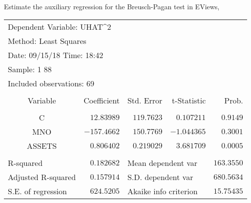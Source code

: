\documentclass[12pt]{report}
\begin{document}
\noindent Estimate the auxiliary regression for the Breusch-Pagan test in EViews,
\begin{figure}[H]
	\centering
\end{figure}
\vspace{-\baselineskip}
\begin{table}[!htbp]
	\centering
	\begin{tabular}{lrrrr}
		\multicolumn{3}{l}{Dependent Variable: UHAT\textasciicircum 2}&\multicolumn{1}{c}{}&\multicolumn{1}{c}{}\\
		\multicolumn{3}{l}{Method: Least Squares}&\multicolumn{1}{c}{}&\multicolumn{1}{c}{}\\
		\multicolumn{3}{l}{Date: 09/15/18   Time: 18:42}&\multicolumn{1}{c}{}&\multicolumn{1}{c}{}\\
		\multicolumn{2}{l}{Sample: 1 88}&\multicolumn{1}{c}{}&\multicolumn{1}{c}{}&\multicolumn{1}{c}{}\\
		\multicolumn{3}{l}{Included observations: 69}&\multicolumn{1}{c}{}&\multicolumn{1}{c}{}\\
		[4.5pt] \hline \\ [-4.5pt]
		\multicolumn{1}{c}{Variable}&\multicolumn{1}{r}{Coefficient}&\multicolumn{1}{r}{Std. Error}&\multicolumn{1}{r}{t-Statistic}&\multicolumn{1}{r}{Prob.}\\
		[4.5pt] \hline \\ [-4.5pt]
		\multicolumn{1}{c}{C}&\multicolumn{1}{r}{$12.83989$}&\multicolumn{1}{r}{$119.7623$}&\multicolumn{1}{r}{$0.107211$}&\multicolumn{1}{r}{$0.9149$}\\
		\multicolumn{1}{c}{MNO}&\multicolumn{1}{r}{$-157.4662$}&\multicolumn{1}{r}{$150.7769$}&\multicolumn{1}{r}{$-1.044365$}&\multicolumn{1}{r}{$0.3001$}\\
		\multicolumn{1}{c}{ASSETS}&\multicolumn{1}{r}{$0.806402$}&\multicolumn{1}{r}{$0.219029$}&\multicolumn{1}{r}{$3.681709$}&\multicolumn{1}{r}{$0.0005$}\\
		[4.5pt] \hline \\ [-4.5pt]
		\multicolumn{1}{l}{R-squared}&\multicolumn{1}{r}{$0.182682$}&\multicolumn{2}{l}{Mean dependent var}&\multicolumn{1}{r}{$163.3550$}\\
		\multicolumn{1}{l}{Adjusted R-squared}&\multicolumn{1}{r}{$0.157914$}&\multicolumn{2}{l}{S.D. dependent var}&\multicolumn{1}{r}{$680.5634$}\\
		\multicolumn{1}{l}{S.E. of regression}&\multicolumn{1}{r}{$624.5205$}&\multicolumn{2}{l}{Akaike info criterion}&\multicolumn{1}{r}{$15.75435$}\\

\end{tabular}
\end{table}
\end{document}
